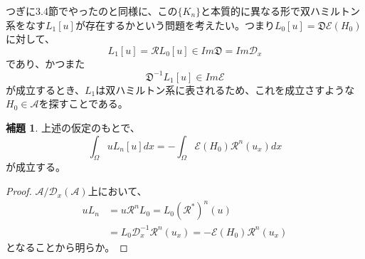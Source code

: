 \documentclass[a4paper, 11pt]{report}
\theoremstyle{definition}
\newtheorem{lemma}{補題}[section]
\begin{document}
 つぎに3.4節でやったのと同様に、この$\{ K_n \}$と本質的に異なる形で双ハミルトン系をなす$L_1[u]$が存在するかという問題を考えたい。つまり$L_0[u]=\mathfrak{D}\mathcal{E}(H_0)$に対して、
\begin{equation}
L_1[u] = \mathcal{R}L_0[u] \in Im\mathfrak{D} = Im\mathcal{D}_x  %
\end{equation}
であり、かつまた
\begin{equation}
\mathfrak{D}^{-1}L_1[u] \in Im\mathcal{E}  %
\end{equation}
が成立するとき、$L_1$は双ハミルトン系に表されるため、これを成立さすような$H_0\in\mathcal{A}$を探すことである。

\begin{lemma}
 上述の仮定のもとで、
\begin{equation*}
\int_\Omega uL_n[u]dx = -\int_\Omega \mathcal{E}(H_0)\mathcal{R}^n(u_x)dx
\end{equation*}
が成立する。
\end{lemma}

\begin{proof}
 $\mathcal{A} / \mathcal{D}_x(\mathcal{A})$上において、
\begin{align*}
uL_n &= u\mathcal{R}^nL_0 = L_0(\mathcal{R}^*)^n(u)\\
&= L_0\mathcal{D}_x^{-1}\mathcal{R}^n(u_x) = -\mathcal{E}(H_0)\mathcal{R}^n(u_x) 
\end{align*}
となることから明らか。
\end{proof}
\end{document}
